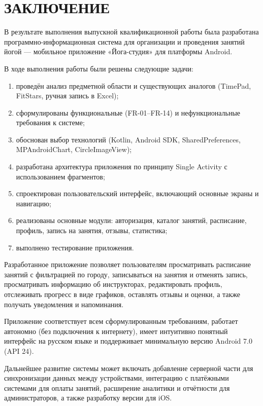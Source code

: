 \section*{ЗАКЛЮЧЕНИЕ}

В результате выполнения выпускной квалификационной работы была разработана программно-информационная система для организации и проведения занятий йогой — мобильное приложение «Йога-студия» для платформы Android.

В ходе выполнения работы были решены следующие задачи:
\begin{enumerate}
	\item проведён анализ предметной области и существующих аналогов (TimePad, FitStars, ручная запись в Excel);
	\item сформулированы функциональные (FR-01–FR-14) и нефункциональные требования к системе;
	\item обоснован выбор технологий (Kotlin, Android SDK, SharedPreferences, MPAndroidChart, CircleImageView);
	\item разработана архитектура приложения по принципу Single Activity с использованием фрагментов;
	\item спроектирован пользовательский интерфейс, включающий основные экраны и навигацию;
	\item реализованы основные модули: авторизация, каталог занятий, расписание, профиль, запись на занятия, отзывы, статистика;
	\item выполнено тестирование приложения.
\end{enumerate}

Разработанное приложение позволяет пользователям просматривать расписание занятий с фильтрацией по городу, записываться на занятия и отменять запись, просматривать информацию об инструкторах, редактировать профиль, отслеживать прогресс в виде графиков, оставлять отзывы и оценки, а также получать уведомления и напоминания.

Приложение соответствует всем сформулированным требованиям, работает автономно (без подключения к интернету), имеет интуитивно понятный интерфейс на русском языке и поддерживает минимальную версию Android 7.0 (API 24).

Дальнейшее развитие системы может включать добавление серверной части для синхронизации данных между устройствами, интеграцию с платёжными системами для оплаты занятий, расширение аналитики и отчётности для администраторов, а также разработку версии для iOS.